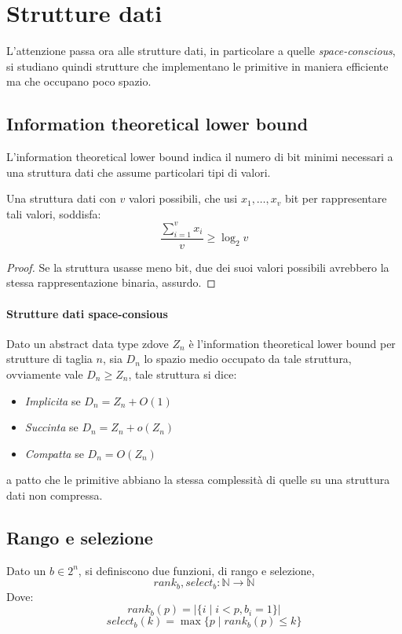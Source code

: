 \section{Strutture dati}
L'attenzione passa ora alle strutture dati, in particolare
a quelle \emph{space-conscious}, si studiano quindi strutture che 
implementano le primitive in maniera efficiente ma che occupano 
poco spazio.

\subsection{Information theoretical lower bound}
L'information theoretical lower bound indica il numero di bit minimi necessari 
a una struttura dati che assume particolari tipi di valori.

\begin{theorem}
    Una struttura dati con $v$ valori possibili, che usi 
    $x_1, \dots, x_v$ bit per rappresentare tali valori, 
    soddisfa:
    $$\frac{\sum_{i=1}^v x_i}{v} \geq \log_2 v$$
\end{theorem}
\begin{proof}
    Se la struttura usasse meno bit, due dei suoi valori possibili 
    avrebbero la stessa rappresentazione binaria, assurdo.
\end{proof}

\paragraph{Strutture dati space-consious}
Dato un abstract data type zdove $Z_n$ è l'information theoretical lower bound
per strutture di taglia $n$, sia $D_n$ lo spazio medio occupato da tale struttura,
ovviamente vale $D_n \geq Z_n$, tale struttura si dice:
\begin{itemize}
    \item \emph{Implicita} se $D_n = Z_n + O(1)$
    \item \emph{Succinta} se $D_n = Z_n + o(Z_n)$
    \item \emph{Compatta} se $D_n = O(Z_n)$
\end{itemize} 
a patto che le primitive abbiano la stessa complessità di quelle su una struttura 
dati non compressa.

\subsection{Rango e selezione}
Dato un $b \in 2^n$, si definiscono due funzioni, di rango e selezione, 
$$\mathit{rank}_b, \mathit{select}_b : \mathbb{N} \longrightarrow \mathbb{N}$$
Dove: 
$$\mathit{rank}_b(p) = |\{i\;|\; i < p, b_i = 1\}|$$
$$\mathit{select}_b(k) = \max \{p\;|\; \mathit{rank}_b(p) \leq k\}$$

